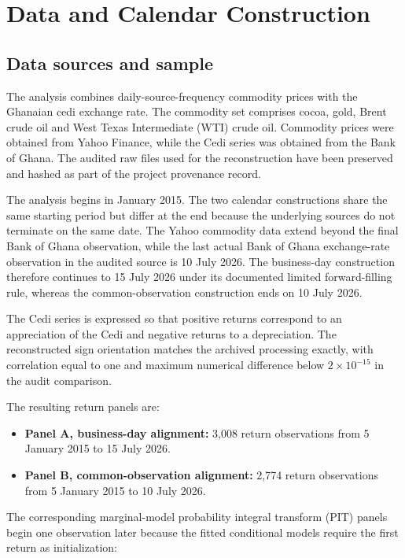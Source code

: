 \section{Data and Calendar Construction}
\label{sec:data_and_calendar_construction}

\subsection{Data sources and sample}

The analysis combines daily-source-frequency commodity prices with the Ghanaian cedi exchange rate. The commodity set comprises cocoa, gold, Brent crude oil and West Texas Intermediate (WTI) crude oil. Commodity prices were obtained from Yahoo Finance, while the Cedi series was obtained from the Bank of Ghana. The audited raw files used for the reconstruction have been preserved and hashed as part of the project provenance record.

The analysis begins in January 2015. The two calendar constructions share the same starting period but differ at the end because the underlying sources do not terminate on the same date. The Yahoo commodity data extend beyond the final Bank of Ghana observation, while the last actual Bank of Ghana exchange-rate observation in the audited source is 10 July 2026. The business-day construction therefore continues to 15 July 2026 under its documented limited forward-filling rule, whereas the common-observation construction ends on 10 July 2026.

The Cedi series is expressed so that positive returns correspond to an appreciation of the Cedi and negative returns to a depreciation. The reconstructed sign orientation matches the archived processing exactly, with correlation equal to one and maximum numerical difference below \(2\times10^{-15}\) in the audit comparison.

The resulting return panels are:

\begin{itemize}
\item \textbf{Panel A, business-day alignment:} 3,008 return observations from 5 January 2015 to 15 July 2026.
\item \textbf{Panel B, common-observation alignment:} 2,774 return observations from 5 January 2015 to 10 July 2026.

\end{itemize}
The corresponding marginal-model probability integral transform (PIT) panels begin one observation later because the fitted conditional models require the first return as initialization:

